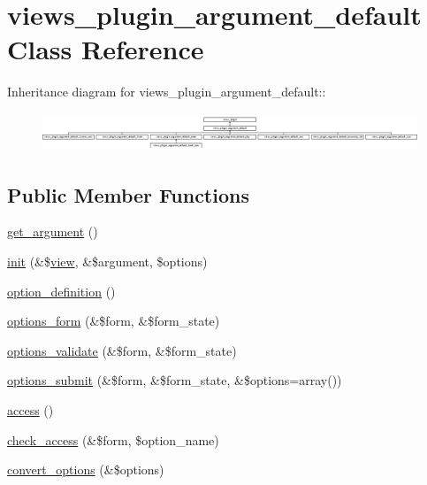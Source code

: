 \hypertarget{classviews__plugin__argument__default}{
\section{views\_\-plugin\_\-argument\_\-default Class Reference}
\label{classviews__plugin__argument__default}
}
Inheritance diagram for views\_\-plugin\_\-argument\_\-default::\begin{figure}[H]
\begin{center}
\leavevmode
\includegraphics[height=1.15523cm]{classviews__plugin__argument__default}
\end{center}
\end{figure}
\subsection*{Public Member Functions}
\begin{DoxyCompactItemize}
\item 
\hyperlink{classviews__plugin__argument__default_a8e67864f4a1ce20b12bc82afe1acd255}{get\_\-argument} ()
\item 
\hyperlink{classviews__plugin__argument__default_a42928a46a7152d94beae91f781a5b845}{init} (\&\$\hyperlink{classview}{view}, \&\$argument, \$options)
\item 
\hyperlink{classviews__plugin__argument__default_ac3a58218880857bc009d4617fab2241b}{option\_\-definition} ()
\item 
\hyperlink{classviews__plugin__argument__default_a9bc59dae448f4c35d422bc54d0879930}{options\_\-form} (\&\$form, \&\$form\_\-state)
\item 
\hyperlink{classviews__plugin__argument__default_a39f9ba2c80352fe029e765771a7af3a5}{options\_\-validate} (\&\$form, \&\$form\_\-state)
\item 
\hyperlink{classviews__plugin__argument__default_af4ea60d1be178072a6cf37feb582222c}{options\_\-submit} (\&\$form, \&\$form\_\-state, \&\$options=array())
\item 
\hyperlink{classviews__plugin__argument__default_a47b0a69da2fb0e45c25aa9c8727f912f}{access} ()
\item 
\hyperlink{classviews__plugin__argument__default_a096aef18bee162b1c78745379a018836}{check\_\-access} (\&\$form, \$option\_\-name)
\item 
\hyperlink{classviews__plugin__argument__default_a4f4afb816d9f6451a7d070fa7b75c8c2}{convert\_\-options} (\&\$options)
\end{DoxyCompactItemize}


